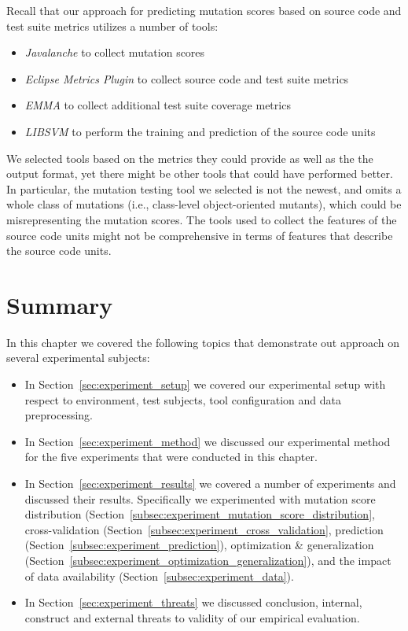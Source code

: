 Recall that our approach for predicting mutation scores based on source code and test suite metrics utilizes a number of tools:

\begin{itemize}
  \item \emph{Javalanche} to collect mutation scores
  \item \emph{Eclipse Metrics Plugin} to collect source code and test suite metrics
  \item \emph{EMMA} to collect additional test suite coverage metrics
  \item \emph{LIBSVM} to perform the training and prediction of the source code units
\end{itemize}

We selected tools based on the metrics they could provide as well as the the output format, yet there might be other tools that could have performed better. In particular, the mutation testing tool we selected is not the newest, and omits a whole class of mutations (i.e., class-level object-oriented mutants), which could be misrepresenting the mutation scores. The tools used to collect the features of the source code units might not be comprehensive in terms of features that describe the source code units.


\section{Summary}
\label{sec:experiment_summary}
In this chapter we covered the following topics that demonstrate out approach on several experimental subjects:

\begin{itemize}
  \item In Section~\ref{sec:experiment_setup} we covered our experimental setup with respect to environment, test subjects, tool configuration and data preprocessing.
  \item In Section~\ref{sec:experiment_method} we discussed our experimental method for the five experiments that were conducted in this chapter.
  \item In Section~\ref{sec:experiment_results} we covered a number of experiments and discussed their results. Specifically we experimented with mutation score distribution (Section~\ref{subsec:experiment_mutation_score_distribution}, cross-validation (Section~\ref{subsec:experiment_cross_validation}, prediction (Section~\ref{subsec:experiment_prediction}), optimization \& generalization (Section~\ref{subsec:experiment_optimization_generalization}), and the impact of data availability (Section~\ref{subsec:experiment_data}).
  \item In Section~\ref{sec:experiment_threats} we discussed conclusion, internal, construct and external threats to validity of our empirical evaluation.
\end{itemize}
